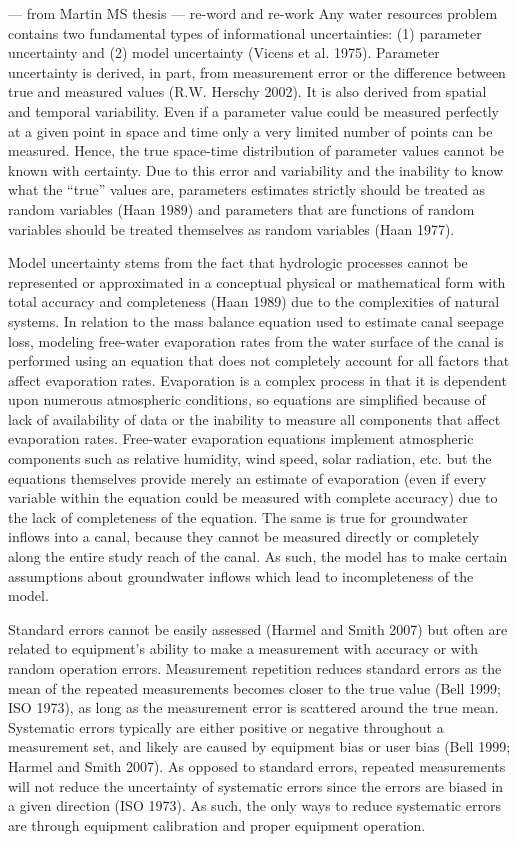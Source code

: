 \begin{linenumbers}
--- from Martin MS thesis --- re-word and re-work
Any water resources problem contains two fundamental types of informational uncertainties: (1) parameter uncertainty and (2) model uncertainty (Vicens et al. 1975).  
Parameter uncertainty is derived, in part, from measurement error or the difference between true and measured values (R.W. Herschy 2002).  
It is also derived from spatial and temporal variability.  
Even if a parameter value could be measured perfectly at a given point in space and time only a very limited number of points can be measured.  
Hence, the true space-time distribution of parameter values cannot be known with certainty.  
Due to this error and variability and the inability to know what the “true” values are, parameters estimates strictly should be treated as random variables (Haan 1989) and parameters that are functions of random variables should be treated themselves as random variables (Haan 1977).

Model uncertainty stems from the fact that hydrologic processes cannot be represented or approximated in a conceptual physical or mathematical form with total accuracy and completeness (Haan 1989) due to the complexities of natural systems. 
In relation to the mass balance equation used to estimate canal seepage loss, modeling free-water evaporation rates from the water surface of the canal is performed using an equation that does not completely account for all factors that affect evaporation rates.  
Evaporation is a complex process in that it is dependent upon numerous atmospheric conditions, so equations are simplified because of lack of availability of data or the inability to measure all components that affect evaporation rates.  
Free-water evaporation equations implement atmospheric components such as relative humidity, wind speed, solar radiation, etc. but the equations themselves provide merely an estimate of evaporation (even if every variable within the equation could be measured with complete accuracy) due to the lack of completeness of the equation.  
The same is true for groundwater inflows into a canal, because they cannot be measured directly or completely along the entire study reach of the canal.  
As such, the model has to make certain assumptions about groundwater inflows which lead to incompleteness of the model.  

Standard errors cannot be easily assessed (Harmel and Smith 2007) but often are related to equipment’s ability to make a measurement with accuracy or with random operation errors.  Measurement repetition reduces standard errors as the mean of the repeated measurements becomes closer to the true value (Bell 1999; ISO 1973), as long as the measurement error is scattered around the true mean.
Systematic errors typically are either positive or negative throughout a measurement set, and likely are caused by equipment bias or user bias (Bell 1999; Harmel and Smith 2007).  As opposed to standard errors, repeated measurements will not reduce the uncertainty of systematic errors since the errors are biased in a given direction (ISO 1973).  As such, the only ways to reduce systematic errors are through equipment calibration and proper equipment operation.


\end{linenumbers}
